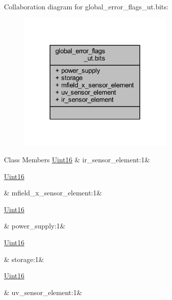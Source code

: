 Collaboration diagram for global\+\_\+error\+\_\+flags\+\_\+ut.\+bits\+:
\nopagebreak
\begin{figure}[H]
\begin{center}
\leavevmode
\includegraphics[width=216pt]{dd/d52/a00221}
\end{center}
\end{figure}
\begin{DoxyFields}{Class Members}
\hypertarget{a00003_a660d9342b0a83c1a03b3082c4a110465}{\hyperlink{a00001_aae7407b021d43f7193a81a58cfb3e297}{Uint16}}\label{a00003_a660d9342b0a83c1a03b3082c4a110465}
&
ir\+\_\+sensor\+\_\+element\+:1&
\\
\hline

\hypertarget{a00003_ae47f53b8f1a226d4fed0b0d7f81b9a1e}{\hyperlink{a00001_aae7407b021d43f7193a81a58cfb3e297}{Uint16}}\label{a00003_ae47f53b8f1a226d4fed0b0d7f81b9a1e}
&
mfield\+\_\+x\+\_\+sensor\+\_\+element\+:1&
\\
\hline

\hypertarget{a00003_a5b707c19ace588b0304807d6fff7b0d5}{\hyperlink{a00001_aae7407b021d43f7193a81a58cfb3e297}{Uint16}}\label{a00003_a5b707c19ace588b0304807d6fff7b0d5}
&
power\+\_\+supply\+:1&
\\
\hline

\hypertarget{a00003_addecebdea58b5f264d27f1f7909bab74}{\hyperlink{a00001_aae7407b021d43f7193a81a58cfb3e297}{Uint16}}\label{a00003_addecebdea58b5f264d27f1f7909bab74}
&
storage\+:1&
\\
\hline

\hypertarget{a00003_a3020e09312bbf84a097b774fe0a187cd}{\hyperlink{a00001_aae7407b021d43f7193a81a58cfb3e297}{Uint16}}\label{a00003_a3020e09312bbf84a097b774fe0a187cd}
&
uv\+\_\+sensor\+\_\+element\+:1&
\\
\hline

\end{DoxyFields}
\label{d4/ddd/a00138}
\hypertarget{a00003_d4/ddd/a00138}{}
